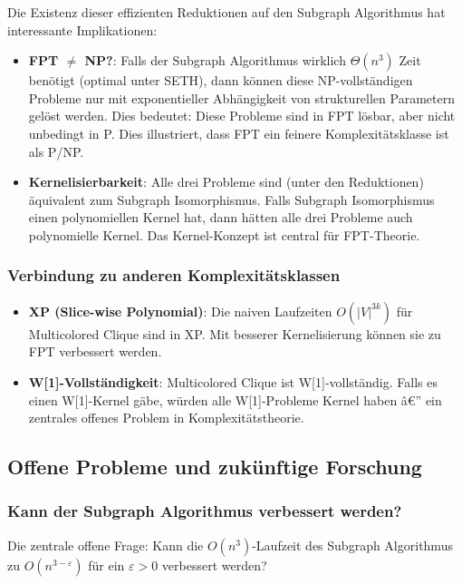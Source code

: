 ﻿\documentclass[a4paper,12pt]{article}
\theoremstyle{definition}
\begin{document}
Die Existenz dieser effizienten Reduktionen auf den Subgraph Algorithmus hat interessante Implikationen:

\begin{itemize}
	\item \textbf{FPT $\neq$ NP?}: Falls der Subgraph Algorithmus wirklich $\Theta(n^3)$ Zeit benötigt (optimal unter SETH), dann können diese NP-vollständigen Probleme nur mit exponentieller Abhängigkeit von strukturellen Parametern gelöst werden. Dies bedeutet: Diese Probleme sind in FPT lösbar, aber nicht unbedingt in P. Dies illustriert, dass FPT ein feinere Komplexitätsklasse ist als P/NP.
	
	\item \textbf{Kernelisierbarkeit}: Alle drei Probleme sind (unter den Reduktionen) äquivalent zum Subgraph Isomorphismus. Falls Subgraph Isomorphismus einen polynomiellen Kernel hat, dann hätten alle drei Probleme auch polynomielle Kernel. Das Kernel-Konzept ist central für FPT-Theorie.
\end{itemize}

\subsubsection{Verbindung zu anderen Komplexitätsklassen}

\begin{itemize}
	\item \textbf{XP (Slice-wise Polynomial)}: Die naiven Laufzeiten $O(|V|^{3k})$ für Multicolored Clique sind in XP. Mit besserer Kernelisierung können sie zu FPT verbessert werden.
	
	\item \textbf{W[1]-Vollständigkeit}: Multicolored Clique ist W[1]-vollständig. Falls es einen W[1]-Kernel gäbe, würden alle W[1]-Probleme Kernel haben â€” ein zentrales offenes Problem in Komplexitätstheorie.
\end{itemize}

\subsection{Offene Probleme und zukünftige Forschung}

\subsubsection{Kann der Subgraph Algorithmus verbessert werden?}

Die zentrale offene Frage: Kann die $O(n^3)$-Laufzeit des Subgraph Algorithmus zu $O(n^{3-\varepsilon})$ für ein $\varepsilon > 0$ verbessert werden?
\end{document}
